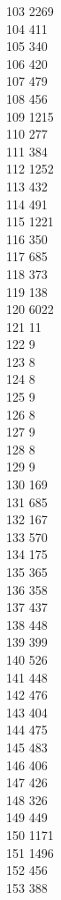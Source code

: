 { 103	2269 \\
 104	411 \\
 105	340 \\
 106	420 \\
 107	479 \\
 108	456 \\
 109	1215 \\
 110	277 \\
 111	384 \\
 112	1252 \\
 113	432 \\
 114	491 \\
 115	1221 \\
 116	350 \\
 117	685 \\
 118	373 \\
 119	138 \\
 120	6022 \\
 121	11 \\
 122	9 \\
 123	8 \\
 124	8 \\
 125	9 \\
 126	8 \\
 127	9 \\
 128	8 \\
 129	9 \\
 130	169 \\
 131	685 \\
 132	167 \\
 133	570 \\
 134	175 \\
 135	365 \\
 136	358 \\
 137	437 \\
 138	448 \\
 139	399 \\
 140	526 \\
 141	448 \\
 142	476 \\
 143	404 \\
 144	475 \\
 145	483 \\
 146	406 \\
 147	426 \\
 148	326 \\
 149	449 \\
 150	1171 \\
 151	1496 \\
 152	456 \\
 153	388 \\
}

